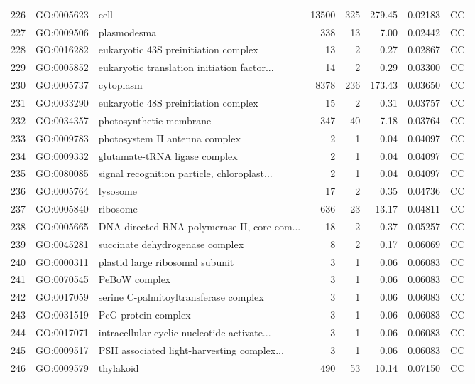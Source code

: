 \documentclass[12pt,oneside,a4paper]{article}
\begin{document}
\begin{longtable}{rllrrrll}
  226 & GO:0005623 & cell & 13500 & 325 & 279.45 & 0.02183 & CC \\ 
  227 & GO:0009506 & plasmodesma & 338 &  13 & 7.00 & 0.02442 & CC \\ 
  228 & GO:0016282 & eukaryotic 43S preinitiation complex &  13 &   2 & 0.27 & 0.02867 & CC \\ 
  229 & GO:0005852 & eukaryotic translation initiation factor... &  14 &   2 & 0.29 & 0.03300 & CC \\ 
  230 & GO:0005737 & cytoplasm & 8378 & 236 & 173.43 & 0.03650 & CC \\ 
  231 & GO:0033290 & eukaryotic 48S preinitiation complex &  15 &   2 & 0.31 & 0.03757 & CC \\ 
  232 & GO:0034357 & photosynthetic membrane & 347 &  40 & 7.18 & 0.03764 & CC \\ 
  233 & GO:0009783 & photosystem II antenna complex &   2 &   1 & 0.04 & 0.04097 & CC \\ 
  234 & GO:0009332 & glutamate-tRNA ligase complex &   2 &   1 & 0.04 & 0.04097 & CC \\ 
  235 & GO:0080085 & signal recognition particle, chloroplast... &   2 &   1 & 0.04 & 0.04097 & CC \\ 
  236 & GO:0005764 & lysosome &  17 &   2 & 0.35 & 0.04736 & CC \\ 
  237 & GO:0005840 & ribosome & 636 &  23 & 13.17 & 0.04811 & CC \\ 
  238 & GO:0005665 & DNA-directed RNA polymerase II, core com... &  18 &   2 & 0.37 & 0.05257 & CC \\ 
  239 & GO:0045281 & succinate dehydrogenase complex &   8 &   2 & 0.17 & 0.06069 & CC \\ 
  240 & GO:0000311 & plastid large ribosomal subunit &   3 &   1 & 0.06 & 0.06083 & CC \\ 
  241 & GO:0070545 & PeBoW complex &   3 &   1 & 0.06 & 0.06083 & CC \\ 
  242 & GO:0017059 & serine C-palmitoyltransferase complex &   3 &   1 & 0.06 & 0.06083 & CC \\ 
  243 & GO:0031519 & PcG protein complex &   3 &   1 & 0.06 & 0.06083 & CC \\ 
  244 & GO:0017071 & intracellular cyclic nucleotide activate... &   3 &   1 & 0.06 & 0.06083 & CC \\ 
  245 & GO:0009517 & PSII associated light-harvesting complex... &   3 &   1 & 0.06 & 0.06083 & CC \\ 
  246 & GO:0009579 & thylakoid & 490 &  53 & 10.14 & 0.07150 & CC \\ 

\end{longtable}
\end{document}
